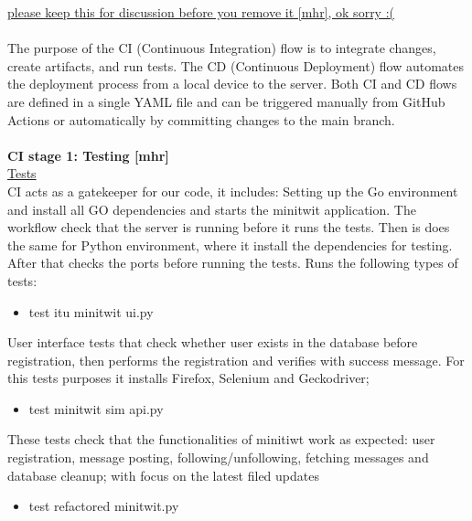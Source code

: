 \documentclass{article}
\begin{document}
\noindent \underline{please keep this for discussion before you remove it [mhr], ok sorry :( }
\\
\\
The purpose of the CI (Continuous Integration) flow is to integrate changes,
create artifacts, and run tests. The CD (Continuous Deployment) flow automates
the deployment process from a local device to the server. Both CI and
CD flows are defined in a single YAML file and can be triggered manually from
GitHub Actions or automatically by committing changes to the main branch.
\\
\\
\noindent \textbf{CI stage 1: Testing [mhr]}\\
\noindent \underline{Tests}\\
CI acts as a gatekeeper for our code, it includes: Setting up the Go environment
and install all GO dependencies and starts the minitwit application. The
workflow check that the server is running before it runs the tests. Then is does
the same for Python environment, where it install the dependencies for testing.
After that checks the ports before running the tests. Runs the following types
of tests:

\begin{itemize}
    \item test itu minitwit ui.py
\end{itemize}

User interface tests that check whether user exists in the database before registration,
then performs the registration and verifies with success message. For
this tests purposes it installs Firefox, Selenium and Geckodriver;
\begin{itemize}
    \item test minitwit sim api.py
\end{itemize}

These tests check that the functionalities of minitiwt work as expected: user registration,
message posting, following/unfollowing, fetching messages and database
cleanup; with focus on the latest filed updates
\begin{itemize}
    \item test refactored minitwit.py
\end{itemize}
\end{document}
